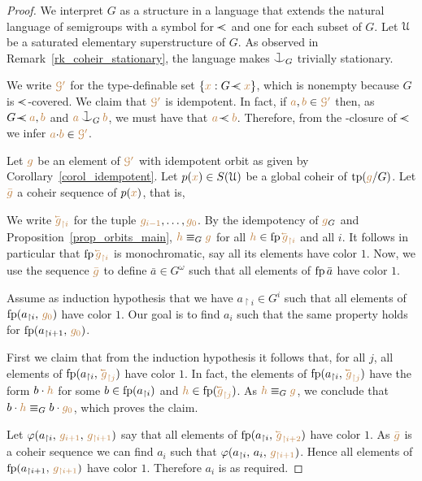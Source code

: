 \begin{proof}
We interpret $G$ as a structure in a language 
that extends the natural language of semigroups
with a symbol for $\cpaw$ and one for each subset of $G$.
%
Let $\EuScript U$ be a saturated elementary superstructure of $G$.
%
As observed in Remark~\ref{rk_coheir_stationary}, 
the language makes $\cnonfork_G$ trivially stationary.

We write ${\color{brown}\EuScript G'}$ for the type-definable set $\{{\mr x} : G\cpaw{\mr x}\}$,
which is nonempty because $G$ is $\cpaw$-covered.
%
We claim that ${\color{brown}\EuScript G'}$ is idempotent.
%
In fact, if ${\color{brown} a},{\color{brown} b}\in{\color{brown}\EuScript G'}$ 
then, as $G\cpaw{\mr a},{\mr b}$ and ${\mr a}\cnonfork_G{\mr b}$, 
we must have that ${\mr a}\cpaw{\mr b}$.
%
Therefore, from the \cpawdot-closure of $\cpaw$ we infer ${\color{brown} a}{\cdot}{\color{brown} b}\in{\color{brown}\EuScript G'}$.

Let ${\color{brown} g}$ be an element of ${\color{brown}\EuScript G'}$ with idempotent orbit 
as given by Corollary~\ref{corol_idempotent}.
%
Let $p({\color{brown} x})\in S(\EuScript U)$ be a global coheir of ${\rm tp}({\color{brown} g}/G)$.
%
Let ${\color{brown}\bar g}$ a coheir sequence of $p({\color{brown} x})$, that is,


We write ${\mr \cev{g}_{\restriction i}}$ for the tuple ${\color{brown} g_{i-1}},\dots,{\color{brown} g_{0}}$.
%
By the idempotency of ${\color{brown} g}_G$ and Proposition~\ref{prop_orbits_main}, 
${\color{brown} h}\equiv_G{\color{brown} g}$ for all ${\mr h}\in \fp\,{\mr \cev{g}_{\restriction i}}$ and all $i$.
It follows in particular that $\fp\,{\mr \cev{g}_{\restriction i}}$ is monochromatic, 
say all its elements have color $1$.
%
Now, we use the sequence ${\color{brown}\bar g}$ to define $\bar a\in G^\omega$
such that all elements of ${\rm fp}\,\bar a$ have color $1$.

Assume as induction hypothesis that we have $a_{\restriction i}\in G^i$ 
such that all elements of ${\rm fp}(a_{\restriction i},\,{\color{brown} g_0})$ have color $1$.
%
Our goal is to find $a_i$ 
such that the same property holds for ${\rm fp}(a_{\restriction i+1},\,{\color{brown} g_0})$.

First we claim that from the induction hypothesis it follows that, 
for all $j$, all elements of $\fp(a_{\restriction i},\,{\mr\cev{g}_{\restriction j}})$ have color $1$.
%
In fact, the elements of $\fp(a_{\restriction i},\,{\mr\cev{g}_{\restriction j}})$ 
have the form $b\cdot{\color{brown}h}$ for some $b\in{\rm fp}(a_{\restriction i})$
and ${\mr h}\in\fp({\mr\cev{g}_{\restriction j}})$.
%
As ${\color{brown} h}\equiv_G{\color{brown} g}$, we conclude that $b\cdot{\color{brown}h}\equiv_Gb\cdot {\color{brown}g_0}$, which proves the claim.

Let $\varphi(a_{\restriction i},\,{\color{brown} g_{i+1}},\,{\color{brown} g_{\restriction i+1}})$ 
say that all elements of $\fp(a_{\restriction i},\,{\mr\cev{g}_{\restriction i+2}})$ have color $1$.
%
As ${\color{brown}\bar g}$ is a coheir sequence we can find  $a_i$ 
such that $\varphi(a_{\restriction i},\,a_i,\,{\color{brown} g_{\restriction i+1}})$.
%
Hence all elements of ${\rm fp}(a_{\restriction i+1},\,{\color{brown} g_{\restriction i+1}})$ have color $1$.
%
Therefore $a_i$ is as required.
\end{proof}

